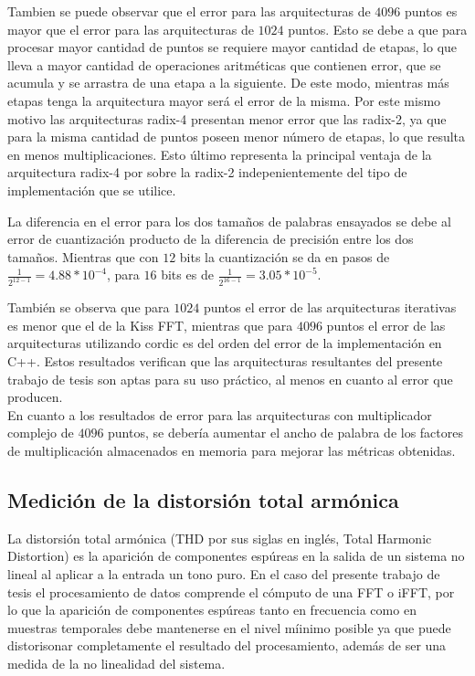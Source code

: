 Tambien se puede observar que el error para las arquitecturas de $4096$ puntos es mayor que el error
para las arquitecturas de $1024$ puntos. Esto se debe a que para procesar mayor cantidad de puntos
se requiere mayor cantidad de etapas, lo que lleva a mayor cantidad de operaciones aritméticas que
contienen error, que se acumula y se arrastra de una etapa a la siguiente. De este modo, mientras
más etapas tenga la arquitectura mayor será el error de la misma. Por este mismo motivo las
arquitecturas radix-4 presentan menor error que las radix-2, ya que para la misma cantidad de
puntos poseen menor número de etapas, lo que resulta en menos multiplicaciones. Esto último
representa la principal ventaja de la arquitectura radix-4 por sobre la radix-2 indepenientemente
del tipo de implementación que se utilice.

La diferencia en el error para los dos tamaños de palabras ensayados se debe al error de
cuantización producto de la diferencia de precisión entre los dos tamaños. Mientras que con
$12$ bits la cuantización se da en pasos de $\frac{1}{2^{12-1}} = 4.88 * 10^{-4}$, para $16$ bits es
de $\frac{1}{2^{16-1}} = 3.05 * 10^{-5}$.

También se observa que para $1024$ puntos el error de las arquitecturas iterativas es menor que el
de la Kiss FFT, mientras que para $4096$ puntos el error de las arquitecturas utilizando cordic es
del orden del error de la implementación en C++. Estos resultados verifican que las arquitecturas
resultantes del presente trabajo de tesis son aptas para su uso práctico, al menos en cuanto al
error que producen.\\ 
En cuanto a los resultados de error para las arquitecturas con multiplicador
complejo de $4096$ puntos, se debería aumentar el ancho de palabra de los factores de multiplicación
almacenados en memoria para mejorar las métricas obtenidas.


\subsection{Medición de la distorsión total armónica}

La distorsión total armónica (THD por sus siglas en inglés, Total Harmonic Distortion) es
la aparición de componentes espúreas en la salida de un sistema no lineal al aplicar a la entrada un
tono puro.
En el caso del presente trabajo de tesis el procesamiento de
datos comprende el cómputo de una FFT o iFFT, por lo que la aparición de componentes espúreas tanto en frecuencia como en muestras
temporales debe mantenerse en el nivel míinimo posible ya que puede distorisonar completamente el
resultado del procesamiento, además de ser una medida de la no linealidad del sistema.

